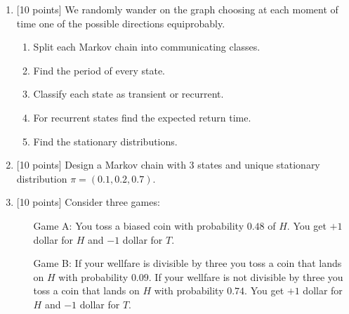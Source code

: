 \documentclass[12pt]{article}
\begin{document}
\begin{enumerate}
    \item {[10 points]} We randomly wander on the graph choosing at each moment of time one of the possible directions equiprobably.
    
    \begin{enumerate}
        \item Split each Markov chain into communicating classes. 
        \item Find the period of every state. 
        \item Classify each state as transient or recurrent.
        \item For recurrent states find the expected return time.
        \item Find the stationary distributions. 
    \end{enumerate}
        
    
    
    \item {[10 points]} Design a Markov chain with 3 states and unique stationary distribution $\pi = (0.1, 0.2, 0.7)$.

    \item {[10 points]} Consider three games:
    \begin{enumerate}
        \item[Game A:] You toss a biased coin with probability $0.48$ of $H$. 
        You get $+1$ dollar for $H$ and $-1$ dollar for $T$.  

        \item[Game B:] If your wellfare is divisible by three you toss a coin that
        lands on $H$ with probability $0.09$. 
        If your wellfare is not divisible by three you toss a coin that lands on $H$ with probability $0.74$.
        You get $+1$ dollar for $H$ and $-1$ dollar for $T$.  
        

\end{enumerate}
\end{enumerate}
\end{document}
